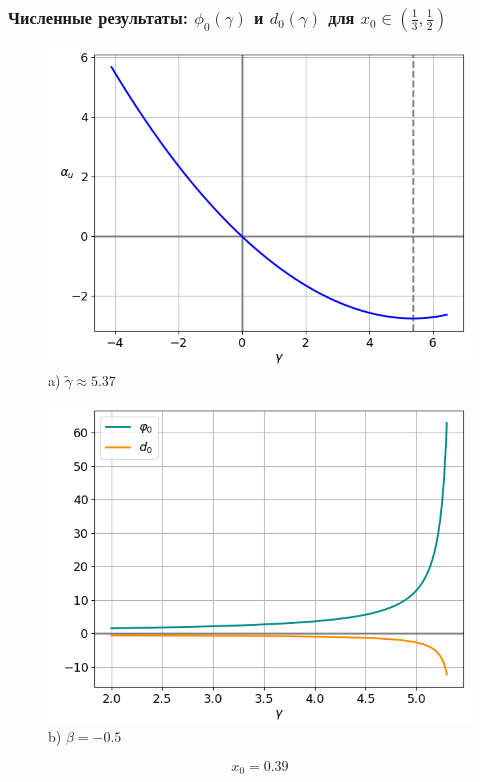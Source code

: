 \documentclass[fullscreen=true, unicode, bookmarks=false]{beamer}
\begin{document}
\begin{frame}
\frametitle{ Численные результаты: $ \phi_0(\gamma) $ и $ d_0(\gamma) $ для $ x_0 \in \left( \frac{1}{3}, \frac{1}{2} \right) $ }

\begin{figure} 
\begin{minipage}[h]{0.49\linewidth}
\begin{center}
\includegraphics[scale=0.38]{x0=0,39.png} \\ {\scriptsize a) $ \widetilde{\gamma} \approx 5.37 $}
\end{center}
\end{minipage} 
\hfill
\begin{minipage}[h]{0.49\linewidth}
\begin{center}
\includegraphics[scale=0.38]{divergent_phi0d0_x0=0,39,beta=-0,5_before.png}  \\ {\scriptsize b) $ \beta = -0.5 $}
\end{center}
\end{minipage} 
\end{figure}

$$ x_0 = 0.39 $$

\end{frame}
\end{document}
